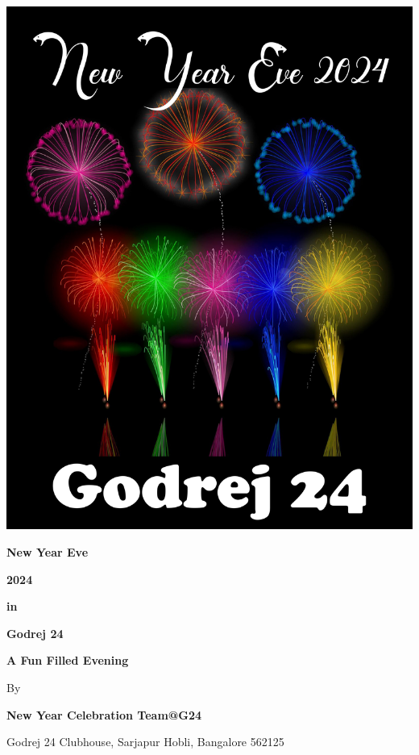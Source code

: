 \documentclass[makeidx, 11pt, oneside, onecolumn, openright, final, svgnames, dvipsnames, extrafontsizes]{memoir}
\begin{document}
\setmainfont{DejaVu Serif}

\begin{center}
\includegraphics[scale=1.0]{first.jpeg}
\end{center}

\begin{center}

{\Huge \bfseries New Year Eve}

\vspace{3mm}

{\Huge \bfseries 2024}

\vspace{0.15in}

{\huge \bfseries in}

\vspace{0.15in}

{\Huge \bfseries Godrej 24}

\vspace{1in}

{\huge \bfseries \calligra A Fun Filled Evening}


\vspace{0.8in}

{\LARGE By}

\vspace{5mm}

{\Large \bfseries New Year Celebration Team@G24}




\vspace{2in}


{\calligra Godrej 24 Clubhouse, Sarjapur Hobli, Bangalore 562125}
\end{center}
\end{document}
